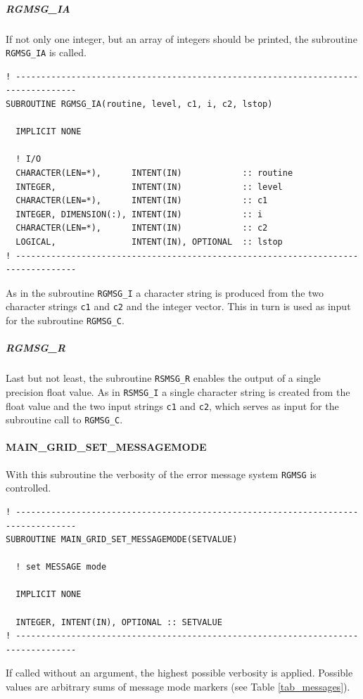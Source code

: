 \documentclass[11pt,twoside]{article}
\begin{document}
 \subparagraph{RGMSG\_IA\\}
If not only one integer, but an array of integers should be printed, the 
subroutine \verb|RGMSG_IA| is called. 
\begin{verbatim}
! ----------------------------------------------------------------------------------
SUBROUTINE RGMSG_IA(routine, level, c1, i, c2, lstop)

  IMPLICIT NONE

  ! I/O
  CHARACTER(LEN=*),      INTENT(IN)            :: routine
  INTEGER,               INTENT(IN)            :: level
  CHARACTER(LEN=*),      INTENT(IN)            :: c1
  INTEGER, DIMENSION(:), INTENT(IN)            :: i
  CHARACTER(LEN=*),      INTENT(IN)            :: c2
  LOGICAL,               INTENT(IN), OPTIONAL  :: lstop
! ----------------------------------------------------------------------------------
\end{verbatim}
As in the subroutine \verb|RGMSG_I| a character string is produced from the
two character strings \verb|c1| and \verb|c2| and the integer vector. This in 
turn is  used as input for the subroutine \verb|RGMSG_C|.
\subparagraph{RGMSG\_R\\}
Last but not least, the subroutine \verb|RSMSG_R| enables the output of 
a single precision float value. As in \verb|RSMSG_I| a single character
string is created from the float value and the two input strings  
\verb|c1| and \verb|c2|, which serves as input for the subroutine call to
\verb|RGMSG_C|.

\paragraph{MAIN\_GRID\_SET\_MESSAGEMODE\\ \label{SETMODE}}
With this subroutine the verbosity of the error message system \verb|RGMSG|
is controlled.
\begin{verbatim}
! ----------------------------------------------------------------------------------
SUBROUTINE MAIN_GRID_SET_MESSAGEMODE(SETVALUE) 

  ! set MESSAGE mode

  IMPLICIT NONE
  
  INTEGER, INTENT(IN), OPTIONAL :: SETVALUE
! ----------------------------------------------------------------------------------
\end{verbatim}
If called without an argument, the highest possible verbosity is applied.
Possible values are arbitrary sums of message mode markers (see Table 
\ref{tab_messages}).
\end{document}
